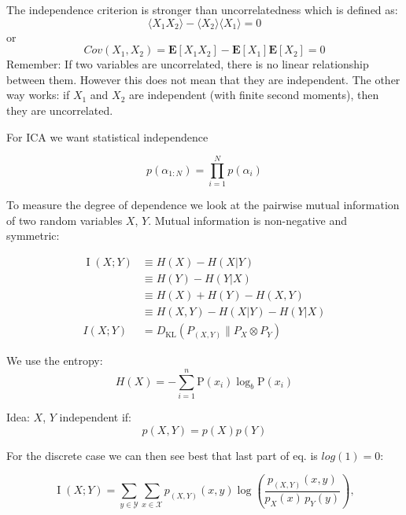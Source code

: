 \documentclass[main]{subfiles}
\begin{document}
The independence criterion is stronger than uncorrelatedness which is defined as:
\begin{equation}
    \langle X_1 X_2 \rangle - \langle X_2 \rangle \langle X_1 \rangle = 0
\end{equation}
or 
\begin{equation}
   Cov(X_1, X_2) = \textbf{E}[X_1 X_2] - \textbf{E}[X_1]\textbf{E}[X_2] = 0
\end{equation}
Remember: If two variables are uncorrelated, there is no linear relationship between them. However this does not mean that they are independent. The other way works: if $X_1$ and $X_2$ are independent (with finite second moments), then they are uncorrelated.

For ICA we want statistical independence

\begin{equation}
    p(\alpha_{1:N}) = \prod_{i=1}^N p(\alpha_i)
\end{equation}

To measure the degree of dependence we look at the pairwise mutual information of two random variables $X$, $Y$. Mutual information is non-negative and symmetric:

\begin{align}
  \operatorname{I}(X;Y) &{} \equiv H(X) - H(X|Y) \\
     &{} \equiv H(Y) - H(Y|X) \\
     &{} \equiv H(X) + H(Y) - H(X, Y) \\
     &{} \equiv H(X, Y) - H(X|Y) - H(Y|X) \\
    I(X;Y)& = D_{\mathrm{KL}}( P_{(X,Y)} \| P_{X} \otimes P_{Y} )
\end{align}

We use the entropy:
\begin{equation}
    H(X) = -\sum_{i=1}^n {\mathrm{P}(x_i) \log_b \mathrm{P}(x_i)}
\end{equation}

Idea: $X$, $Y$ independent if:
\begin{equation}
 p(X, Y) = p(X)p(Y)
\end{equation}

For the discrete case we can then see best that last part of eq. is $log(1) = 0$:

\begin{equation}
    \operatorname{I}(X;Y) = \sum_{y \in \mathcal Y} \sum_{x \in \mathcal X}
    { p_{(X,Y)}(x,y) \log{ \left(\frac{p_{(X,Y)}(x,y)}{p_X(x)\,p_Y(y)} \right) }},
\end{equation}
\end{document}
